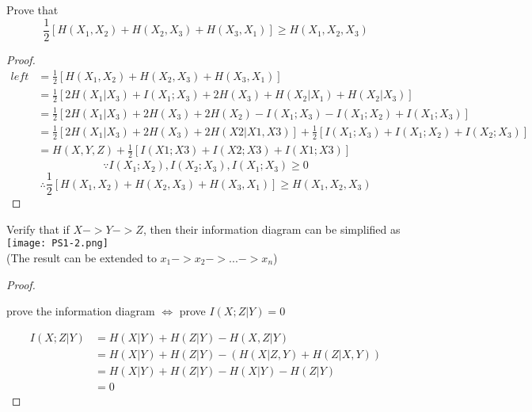 \documentclass[12pt]{article}
\newenvironment{problem}[2][Problem]{\begin{trivlist}
\item[\hskip \labelsep {\bfseries #1}\hskip \labelsep {\bfseries #2.}]}{\end{trivlist}}
\begin{document}
\begin{problem}{5 Subset inequality}
    \item
    Prove that 
    $$\frac{1}{2}[H(X_1,X_2)+H(X_2,X_3)+H(X_3,X_1)]\geq H(X_1,X_2,X_3)$$
\end{problem}

\begin{proof}{}
    \item
    \begin{align*}
        left &= \frac{1}{2}[H(X_1,X_2)+H(X_2,X_3)+H(X_3,X_1)] \\
            &= \frac{1}{2}[2H(X_1|X_3)+I(X_1;X_3)+2H(X_3)+H(X_2|X_1)+H(X_2|X_3)] \\
            &= \frac{1}{2}[2H(X_1|X_3)+2H(X_3)+2H(X_2)-I(X_1;X_3)-I(X_1;X_2)+I(X_1;X_3)] \\
            &= \frac{1}{2}[2H(X_1|X_3)+2H(X_3)+2H(X2|X1,X3)]+\frac{1}{2}[I(X_1;X_3)+I(X_1;X_2)+I(X_2;X_3)] \\
            &= H(X,Y,Z)+\frac{1}{2}[I(X1;X3)+I(X2;X3)+I(X1;X3)]
    \end{align*}
    $$\because
        I(X_1;X_2),I(X_2;X_3),I(X_1;X_3)\geq 0
    $$
    $$
    \therefore
        \frac{1}{2}[H(X_1,X_2)+H(X_2,X_3)+H(X_3,X_1)]\geq H(X_1,X_2,X_3)
    $$
\end{proof}

\begin{problem}{6 Information diagram for Markov Chain}
    \item
    Verify that if $X->Y->Z$, then their information diagram can be simplified as 
    \newline
    \texttt{[image: PS1-2.png]}\\
    (The result can be extended to $x_1->x_2->...->x_n$)
\end{problem}
\begin{proof}{}
    \item
    \begin{center}
    prove the information diagram $\Longleftrightarrow$ prove $I(X;Z\big|Y)=0$ \\
    \end{center}
    \begin{align*}
        I(X;Z|Y) &= H(X|Y)+H(Z|Y)-H(X,Z|Y)\\
                &= H(X|Y)+H(Z|Y)-(H(X|Z,Y)+H(Z|X,Y))\\
                &= H(X|Y)+H(Z|Y)-H(X|Y)-H(Z|Y)\\
                &= 0
    \end{align*}
\end{proof}
\end{document}
